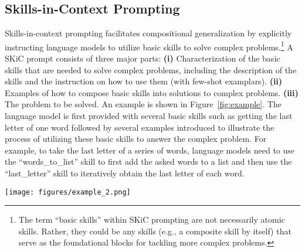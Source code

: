 \subsection{Skills-in-Context Prompting}
Skills-in-context prompting facilitates compositional generalization by explicitly instructing language models to utilize basic skills to solve complex problems.\footnote{The term ``basic skills'' within SKiC prompting are not necessarily atomic skills. Rather, they could be any skills (e.g., a composite skill by itself) that serve as the foundational blocks for tackling more complex problems.} A SKiC prompt consists of three major parts: \textbf{(i)} Characterization of the basic skills that are needed to solve complex problems, including the description of the skills and the instruction on how to use them (with few-shot examplars). \textbf{(ii)} Examples of how to compose basic skills into solutions to complex problems. \textbf{(iii)} The problem to be solved. An example is shown in Figure~\ref{fig:example}. The language model is first provided with several basic skills such as getting the last letter of one word followed by several examples introduced to illustrate the process of utilizing these basic skills to answer the complex problem. For example, to take the last letter of a series of words, language models need to use the ``words\_to\_list'' skill to first add the asked words to a list and then use the ``last\_letter'' skill to iteratively obtain the last letter of each word. 




\begin{figure*}[t]
\begin{center}
\centerline{\texttt{[image: figures/example\_2.png]}}
\caption{Skills-in-Context Prompting. The prompt consists of three building blocks: (i) the (basic) skills for solving a complex task, (ii) (few-shot) examples of how to compose the skills to solve the complex problems, and (iii) the problem to be solved. The few-shot demonstration examples for the skills are omitted above for brevity. The above prompt will be fed into an LLM to generate the output --- see Figure \ref{Tab:example_last_letter_skill} for an example of the output. Note that the compositional examplars demonstrate how to ground the reasoning steps onto the basic skills (highlighted in colors).} \label{fig:example}
\end{center}
\vskip -0.2in
\end{figure*}





